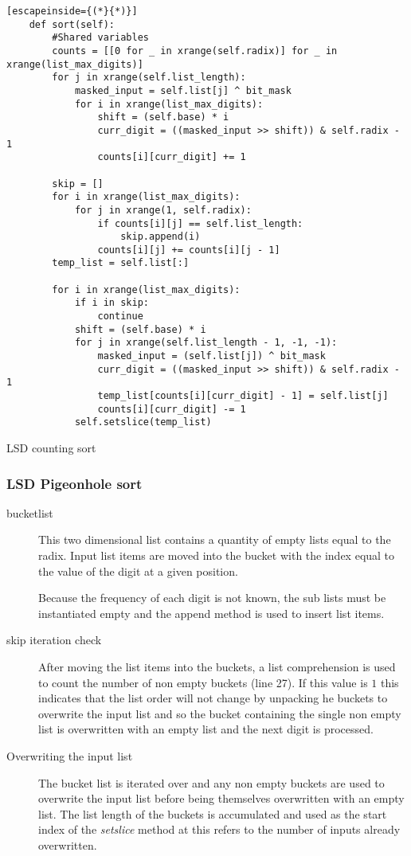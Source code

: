 \documentclass[12pt]{article}
\begin{document}
\begin{table}[H]
	\lstset{
		language=python,
    numbers=left,
    stepnumber=1,
    showstringspaces=false,
    tabsize=3,
    breaklines=true,
    breakatwhitespace=false,}
	\centering
	\begin{lstlisting}[escapeinside={(*}{*)}]
	def sort(self):
		#Shared variables		
		counts = [[0 for _ in xrange(self.radix)] for _ in xrange(list_max_digits)]
		for j in xrange(self.list_length):
			masked_input = self.list[j] ^ bit_mask
			for i in xrange(list_max_digits):
				shift = (self.base) * i
				curr_digit = ((masked_input >> shift)) & self.radix - 1
				counts[i][curr_digit] += 1

		skip = []
		for i in xrange(list_max_digits):
			for j in xrange(1, self.radix):
				if counts[i][j] == self.list_length:
					skip.append(i)
				counts[i][j] += counts[i][j - 1]
		temp_list = self.list[:]

		for i in xrange(list_max_digits):
			if i in skip:
				continue
			shift = (self.base) * i
			for j in xrange(self.list_length - 1, -1, -1):
				masked_input = (self.list[j]) ^ bit_mask
				curr_digit = ((masked_input >> shift)) & self.radix - 1
				temp_list[counts[i][curr_digit] - 1] = self.list[j]
				counts[i][curr_digit] -= 1
			self.setslice(temp_list)
	\end{lstlisting}
	\caption*{LSD counting sort}
\end{table}
\pagebreak
\subsubsection{LSD Pigeonhole sort}
\begin{description}
	\item[bucket\textunderscore list] This two dimensional list contains a quantity of empty lists equal to the radix. Input list items are moved into the bucket with the index equal to the value of the digit at a given position.\par Because the frequency of each digit is not known, the sub lists must be instantiated empty and the append method is used to insert list items.
	\item[skip iteration check] After moving the list items into the buckets, a list comprehension is used to count the number of non empty buckets (line 27). If this value is $1$ this indicates that the list order will not change by unpacking he buckets to overwrite the input list and so the bucket containing the single non empty list is overwritten with an empty list and the next digit is processed.
	\item[Overwriting the input list] The bucket list is iterated over and any non empty buckets are used to overwrite the input list before being themselves overwritten with an empty list. The list length of the buckets is accumulated and used as the start index of the \textit{setslice} method at this refers to the number of inputs already overwritten.
\end{description}
\end{document}
